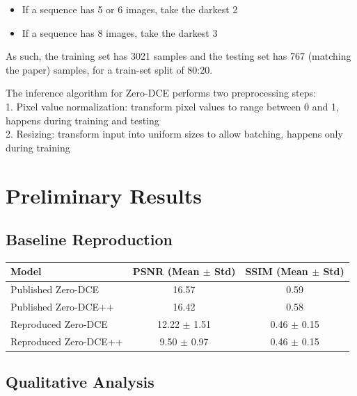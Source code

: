 \documentclass[11pt, letterpaper]{article}
\begin{document}
\begin{itemize}
    \item If a sequence has 5 or 6 images, take the darkest 2
    \item If a sequence has 8 images, take the darkest 3
\end{itemize}

As such, the training set has 3021 samples and the testing set has 767 (matching the paper) samples, for a train-set split of 80:20.

The inference algorithm for Zero-DCE performs two preprocessing steps: \\
1. Pixel value normalization: transform pixel values to range between 0 and 1, happens during training and testing \\
2. Resizing: transform input into uniform sizes to allow batching, happens only during training

\section{Preliminary Results}

\subsection{Baseline Reproduction}

\begin{center}
\begin{tabular}{lcc}
\toprule
\textbf{Model} & \textbf{PSNR (Mean $\pm$ Std)} & \textbf{SSIM (Mean $\pm$ Std)} \\
\midrule
Published Zero-DCE & 16.57 & 0.59 \\
Published Zero-DCE++ & 16.42 & 0.58 \\
Reproduced Zero-DCE & 12.22 $\pm$ 1.51 & 0.46 $\pm$ 0.15 \\
Reproduced Zero-DCE++ & 9.50 $\pm$ 0.97 & 0.46 $\pm$ 0.15 \\
\bottomrule
\end{tabular}
\end{center}

\subsection{Qualitative Analysis}
\end{document}
